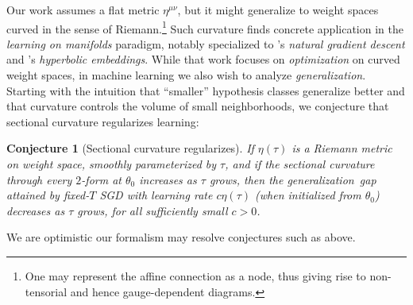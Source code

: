 \documentclass[openany, notitlepage, justified]{tufte-book}
\theoremstyle{plain}
\newtheorem{conj}{Conjecture}
\theoremstyle{definition}
\begin{document}
        Our work assumes a flat metric $\eta^{\mu\nu}$, but it might
        generalize to weight spaces curved in the sense of Riemann.\footnote{
            One may represent the affine connection as a node, thus giving
            rise to non-tensorial and hence gauge-dependent diagrams.
        }  Such curvature finds concrete application in the \emph{learning on
        manifolds} paradigm,\cite{ab07, zh16} notably specialized to
        \citet{am98}'s \emph{natural gradient descent} and \citet{ni17}'s
        \emph{hyperbolic embeddings}.  While that work focuses on
        \emph{optimization} on curved weight spaces, in machine learning we
        also wish to analyze \emph{generalization}.
        Starting with the intuition that ``smaller'' hypothesis classes
        generalize better and that curvature controls the volume of small
        neighborhoods, we conjecture that sectional curvature regularizes
        learning:
        \begin{conj}[Sectional curvature regularizes]
            If $\eta(\tau)$ is a Riemann metric on weight space, smoothly
            parameterized by $\tau$, and if the sectional curvature through
            every $2$-form at $\theta_0$ increases as $\tau$ grows, then
            the generalization\ gap attained by fixed-$T$ SGD with learning rate $c
            \eta(\tau)$ (when initialized from $\theta_0$) decreases as $\tau$
            grows, for all sufficiently small $c>0$.
        \end{conj}
        We are optimistic our formalism may resolve conjectures such as above.




       
 

\setcounter{secnumdepth}{-1}
    
    {
        
    }
    \restoregeometry
\setcounter{secnumdepth}{1}

\end{document}
